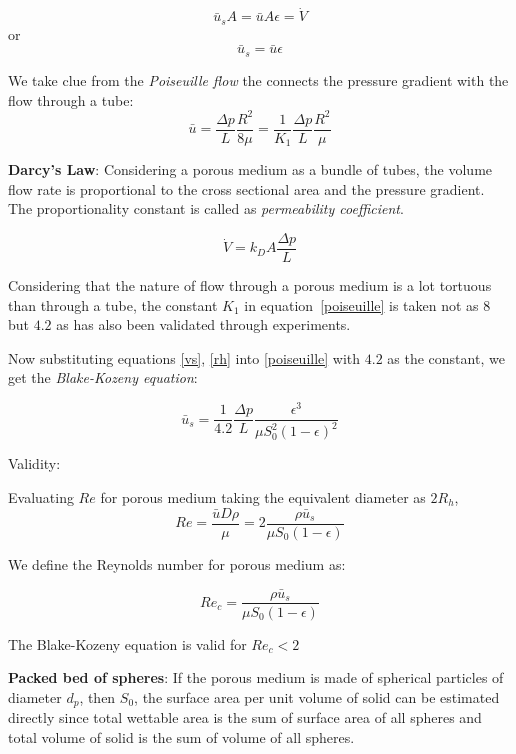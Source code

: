 $$ \bar{u}_s A = \bar{u} A\epsilon = \dot{V} $$
or
\begin{equation}
\label{vs}
\bar{u}_s  = \bar{u} \epsilon 
\end{equation}

We take clue from the \textit{Poiseuille flow} the connects the pressure gradient with the flow through a tube:
\begin{equation}
\label{poiseuille}
\bar{u} = \frac{\Delta p}{L} \frac{R^2}{8\mu} = \frac{1}{K_1} \frac{\Delta p}{L} \frac{R^2}{\mu}
\end{equation}

{\bf Darcy's Law}: Considering a porous medium as a bundle of tubes, the volume flow rate is proportional to the cross sectional area and the pressure gradient. The proportionality constant is called as \textit{permeability coefficient}.

\begin{equation}
\label{darcylaw}
\dot{V} = k_D A \frac{\Delta p}{L}
\end{equation}

Considering that the nature of flow through a porous medium is a lot tortuous than through a tube, the constant $K_1$ in equation~\ref{poiseuille} is taken not as $8$ but $4.2$ as has also been validated through experiments.


Now substituting equations \ref{vs}, \ref{rh} into \ref{poiseuille} with $4.2$ as the constant, we get the \textit{Blake-Kozeny equation}:

\begin{equation}
\label{pmflow}
\boxed{
  \bar{u}_s = \frac{1}{4.2} \frac{\Delta p}{L} \frac{\epsilon^3}{\mu S_0^2 \left(1-\epsilon\right)^2}
}
\end{equation}


Validity:

Evaluating $Re$ for porous medium taking the equivalent diameter as $2R_h$,
$$Re = \frac{\bar{u}D\rho}{\mu} = 2 \frac{\rho \bar{u}_s}{\mu S_0 (1-\epsilon)} $$

We define the Reynolds number for porous medium as:

\begin{equation}
\boxed{
   Re_c = \frac{\rho \bar{u}_s}{\mu S_0 (1-\epsilon)}
}
\label{rec}
\end{equation}

The Blake-Kozeny equation is valid for $Re_c < 2$

{\bf Packed bed of spheres}: If the porous medium is made of spherical particles of diameter $d_p$, then $S_0$, the surface area per unit volume of solid can be estimated directly since total wettable area is the sum of surface area of all spheres and total volume of solid is the sum of volume of all spheres.

